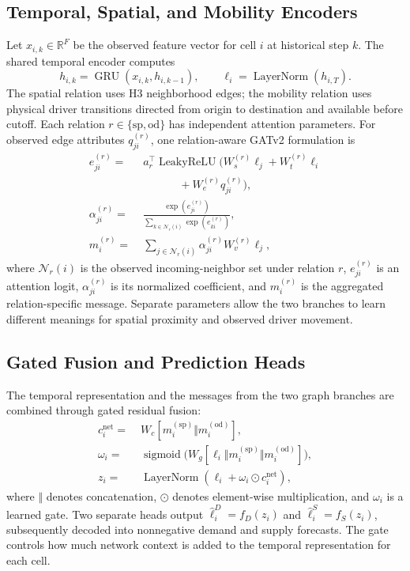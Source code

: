 \documentclass[a4paper,10pt,twocolumn]{article}
\newcommand{\sigmoid}{\operatorname{sigmoid}}
\newcommand{\LN}{\operatorname{LayerNorm}}
\newcommand{\GRU}{\operatorname{GRU}}
\begin{document}
\subsection{Temporal, Spatial, and Mobility Encoders}
Let $x_{i,k}\in\mathbb R^{F}$ be the observed feature vector for cell $i$
at historical step $k$. The shared temporal encoder computes
\begin{equation}
 h_{i,k}=\GRU(x_{i,k},h_{i,k-1}),\qquad
 \ell_i=\LN(h_{i,T}).
 \label{eq:gru}
\end{equation}
The spatial relation uses H3 neighborhood edges; the mobility relation
uses physical driver transitions directed from origin to destination and
available before cutoff. Each relation $r\in\{\mathrm{sp},\mathrm{od}\}$
has independent attention parameters. For observed edge attributes
$q_{ji}^{(r)}$, one relation-aware GATv2 formulation is
\begin{equation}
\begin{aligned}
 e_{ji}^{(r)}=&\; a_r^\top \operatorname{LeakyReLU}
 \bigl(W_s^{(r)}\ell_j+W_t^{(r)}\ell_i\\
 &\hspace{42pt}+W_e^{(r)}q_{ji}^{(r)}\bigr),\\
 \alpha_{ji}^{(r)}=&\;
 \frac{\exp(e_{ji}^{(r)})}{\sum_{k\in\mathcal N_r(i)}\exp(e_{ki}^{(r)})},\\
 m_i^{(r)}=&\;\sum_{j\in\mathcal N_r(i)}
 \alpha_{ji}^{(r)}W_v^{(r)}\ell_j,
\end{aligned}
\label{eq:attention}
\end{equation}
where $\mathcal N_r(i)$ is the observed incoming-neighbor set under
relation $r$, $e_{ji}^{(r)}$ is an attention logit,
$\alpha_{ji}^{(r)}$ is its normalized coefficient, and $m_i^{(r)}$ is
the aggregated relation-specific message. Separate parameters allow the two
branches to learn different meanings for spatial proximity and observed
driver movement.

\subsection{Gated Fusion and Prediction Heads}
The temporal representation and the messages from the two graph branches are
combined through gated residual fusion:
\begin{equation}
\begin{aligned}
 c_i^{\mathrm{net}}=&\;W_c[m_i^{(\mathrm{sp})}\Vert
                         m_i^{(\mathrm{od})}],\\
 \omega_i=&\;\sigmoid\bigl(W_g[\ell_i\Vert m_i^{(\mathrm{sp})}
                  \Vert m_i^{(\mathrm{od})}]\bigr),\\
 z_i=&\;\LN(\ell_i+\omega_i\odot c_i^{\mathrm{net}}),
\end{aligned}
\label{eq:fusion}
\end{equation}
where $\Vert$ denotes concatenation, $\odot$ denotes element-wise
multiplication, and $\omega_i$ is a learned gate. Two separate heads output
$\widehat\ell_i^D=f_D(z_i)$ and $\widehat\ell_i^S=f_S(z_i)$, subsequently
decoded into nonnegative demand and supply forecasts. The gate controls how
much network context is added to the temporal representation for each cell.
\end{document}
